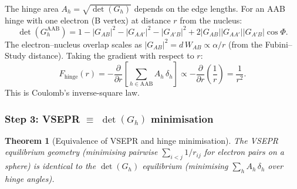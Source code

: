 \documentclass[12pt]{article}
\newtheorem{theorem}{Theorem}[section]
\theoremstyle{remark}
\theoremstyle{definition}
\begin{document}
The hinge area $A_h = \sqrt{\det(G_h)}$ depends on the edge lengths.  For an AAB hinge with one electron (B vertex) at distance $r$ from the nucleus:
\begin{equation}
\det(G_h^{\text{AAB}}) = 1 - |G_{AB}|^2 - |G_{AA'}|^2 - |G_{A'B}|^2 + 2|G_{AB}||G_{AA'}||G_{A'B}|\cos\Phi.
\end{equation}
The electron--nucleus overlap scales as $|G_{AB}|^2 = d\,W_{AB} \propto \alpha/r$ (from the Fubini--Study distance).  Taking the gradient with respect to $r$:
\begin{equation}
F_\text{hinge}(r) = -\frac{\partial}{\partial r}\left[\sum_{h \in \text{AAB}} A_h\,\delta_h\right] \propto -\frac{\partial}{\partial r}\left(\frac{1}{r}\right) = \frac{1}{r^2}.
\end{equation}
This is Coulomb's inverse-square law.

\subsubsection{Step 3: VSEPR $\equiv$ $\det(G_h)$ minimisation}

\begin{theorem}[Equivalence of VSEPR and hinge minimisation]
\label{thm:vsepr_equiv}
The VSEPR equilibrium geometry (minimising pairwise $\sum_{i < j} 1/r_{ij}$ for electron pairs on a sphere) is identical to the $\det(G_h)$ equilibrium (minimising $\sum_h A_h\,\delta_h$ over hinge angles).
\end{theorem}
\end{document}
